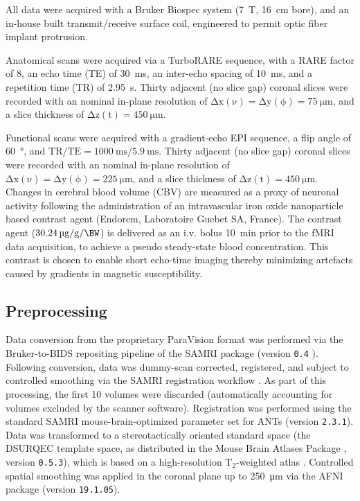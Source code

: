 All data were acquired with a Bruker Biospec system (\SI{7}{\tesla}, \SI{16}{\centi\meter} bore), and an in-house built transmit/receive surface coil, engineered to permit optic fiber implant protrusion.

Anatomical scans were acquired via a TurboRARE sequence, with a RARE factor of 8, an echo time (TE) of \SI{30}{\milli\second}, an inter-echo spacing of \SI{10}{\milli\second}, and a repetition time (TR) of \SI{2.95}{\second}.
Thirty adjacent (no slice gap) coronal slices were recorded with an nominal in-plane resolution of $\mathrm{\Delta x(\nu)=\Delta y(\phi)=\SI{75}{\micro\meter}}$, and a slice thickness of $\mathrm{\Delta z(t)=\SI{450}{\micro\meter}}$.

Functional scans were acquired with a gradient-echo EPI sequence, a flip angle of \SI{60}{\degree}, and $\mathrm{TR/TE = \SI{1000}{\milli\second}/\SI{5.9}{\milli\second}}$.
Thirty adjacent (no slice gap) coronal slices were recorded with an nominal in-plane resolution of $\mathrm{\Delta x(\nu)=\Delta y(\phi)=\SI{225}{\micro\meter}}$, and a slice thickness of $\mathrm{\Delta z(t)=\SI{450}{\micro\meter}}$.
Changes in cerebral blood volume (CBV) are measured as a proxy of neuronal activity following the administration of an intravascular iron oxide nanoparticle based contrast agent (Endorem, Laboratoire Guebet SA, France).
The contrast agent ($\SI{30.24}{\micro\gram\per\gram\per\BW}$) is delivered as an i.v. bolus \SI{10}{\minute} prior to the fMRI data acquisition, to achieve a pseudo steady-state blood concentration.
This contrast is chosen to enable short echo-time imaging thereby minimizing artefacts caused by gradients in magnetic susceptibility.

\subsection{Preprocessing}

Data conversion from the proprietary ParaVision format was performed via the Bruker-to-BIDS repositing pipeline \cite{aowsis} of the SAMRI package (version \textcolor{mg}{\texttt{0.4}} \cite{samri}).
Following conversion, data was dummy-scan corrected, registered, and subject to controlled smoothing via the SAMRI registration workflow \cite{irsabi}.
As part of this processing, the first 10 volumes were discarded (automatically accounting for volumes excluded by the scanner software).
Registration was performed using the standard SAMRI mouse-brain-optimized parameter set for ANTs \cite{ants} (version \textcolor{mg}{\texttt{2.3.1}}).
Data was transformed to a stereotactically oriented standard space (the DSURQEC template space, as distributed in the Mouse Brain Atlases Package \cite{atlases_generator}, version \textcolor{mg}{\texttt{0.5.3}}), which is based on a high-resolution $\mathrm{T_2}$-weighted atlas \cite{dsu1}.
Controlled spatial smoothing was applied in the coronal plane up to \SI{250}{\micro\meter} via the AFNI package \cite{afni} (version \textcolor{mg}{\texttt{19.1.05}}).

